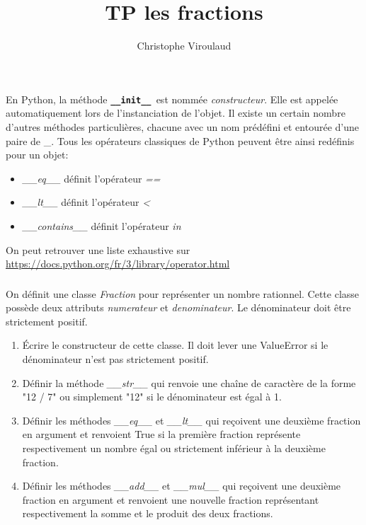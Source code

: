 \documentclass[svgnames,11pt]{beamer}
\author[]{Christophe Viroulaud}
\title{TP les fractions}
\date{}
\institute{Terminale - NSI}
\begin{document}
\begin{frame}
    \titlepage
\end{frame}
\begin{frame}
    \frametitle{}

    En Python, la méthode \texttt{\textbf{\_\_init\_\_ }}est nommée \emph{constructeur}. Elle est appelée automatiquement lors de l'instanciation de l'objet.
    Il existe un certain nombre d'autres méthodes particulières, chacune avec un nom prédéfini et entourée d'une paire de \_.
    Tous les opérateurs classiques de Python peuvent être ainsi redéfinis pour un objet:
    \begin{itemize}
        \item \emph{\_\_eq\_\_} définit l'opérateur \emph{==}
        \item \emph{\_\_lt\_\_} définit l'opérateur \emph{<}
        \item \emph{\_\_contains\_\_} définit l'opérateur \emph{in}
    \end{itemize}
    On peut retrouver une liste exhaustive sur \url{https://docs.python.org/fr/3/library/operator.html}

\end{frame}
\begin{frame}
    \frametitle{}

    On définit une classe \emph{Fraction} pour représenter un nombre rationnel. Cette classe possède deux attributs \emph{numerateur} et \emph{denominateur}. Le dénominateur doit être strictement positif.
    \begin{enumerate}
        \item Écrire le constructeur de cette classe. Il doit lever une ValueError si le dénominateur n'est pas strictement positif.
        \item Définir la méthode \emph{\_\_str\_\_} qui renvoie une chaîne de caractère de la forme "12 / 7" ou simplement "12" si le dénominateur est égal à 1.
        \item Définir les méthodes \emph{\_\_eq\_\_} et \emph{\_\_lt\_\_} qui reçoivent une deuxième fraction en argument et renvoient True si la première fraction représente respectivement un nombre égal ou strictement inférieur à la deuxième fraction.
        \item Définir les méthodes \emph{\_\_add\_\_} et \emph{\_\_mul\_\_} qui reçoivent une deuxième fraction en argument et renvoient une nouvelle fraction représentant respectivement la somme et le produit des deux fractions.
    \end{enumerate}

\end{frame}
\end{document}
